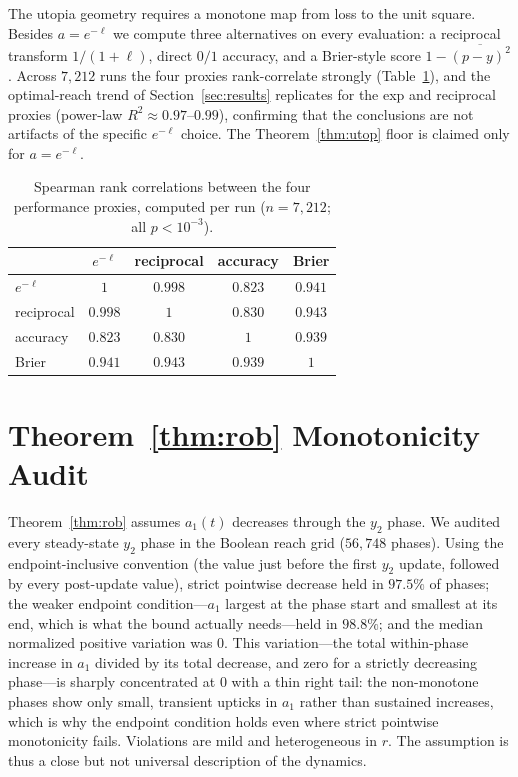 \documentclass[pmlr]{jmlr} %
\begin{document}
The utopia geometry requires a monotone map from loss to the unit square. Besides $a=e^{-\ell}$ we
compute three alternatives on every evaluation: a reciprocal transform $1/(1+\ell)$, direct $0/1$ accuracy, and
a Brier-style score $1-\overline{(p-y)^2}$. Across $7{,}212$ runs the four proxies rank-correlate strongly
(Table~\ref{tab:proxy}), and the optimal-reach trend of Section~\ref{sec:results} replicates for the exp and
reciprocal proxies (power-law $R^2\approx0.97$--$0.99$), confirming that the conclusions are not artifacts of
the specific $e^{-\ell}$ choice. The Theorem~\ref{thm:utop} floor is claimed only for $a=e^{-\ell}$.

\begin{table}[htbp]
\centering
\caption{Spearman rank correlations between the four performance proxies, computed per run
($n=7{,}212$; all $p<10^{-3}$).}
\label{tab:proxy}
\begin{tabular}{lcccc}
\toprule
& $e^{-\ell}$ & reciprocal & accuracy & Brier \\
\midrule
$e^{-\ell}$   & $1$      & $0.998$ & $0.823$ & $0.941$ \\
reciprocal    & $0.998$  & $1$     & $0.830$ & $0.943$ \\
accuracy      & $0.823$  & $0.830$ & $1$     & $0.939$ \\
Brier         & $0.941$  & $0.943$ & $0.939$ & $1$     \\
\bottomrule
\end{tabular}
\end{table}

\section{Theorem~\ref{thm:rob} Monotonicity Audit}
\label{app:monotonicity}

Theorem~\ref{thm:rob} assumes $a_1(t)$ decreases through the $y_2$ phase. We audited every steady-state
$y_2$ phase in the Boolean reach grid ($56{,}748$ phases). Using the endpoint-inclusive convention (the value just before the first $y_2$ update, followed by every post-update value), strict pointwise decrease held in $97.5\%$ of phases; the weaker endpoint condition---$a_1$ largest at the phase start and smallest at its end, which is what the bound actually needs---held in $98.8\%$; and the median normalized positive variation was
$0$. This variation---the total within-phase increase in $a_1$ divided by its total decrease, and zero for a strictly decreasing phase---is sharply concentrated at $0$ with a thin right tail: the non-monotone phases show only small, transient upticks in $a_1$ rather than sustained increases, which is why the endpoint condition holds even where strict pointwise monotonicity fails. Violations are mild and heterogeneous in $r$. The assumption is thus a close but not universal description of the dynamics.
\end{document}
